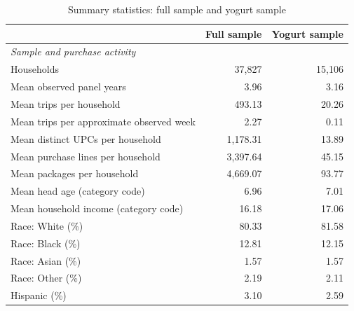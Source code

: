 \begin{table}[htbp]
\centering
\caption{Summary statistics: full sample and yogurt sample}
\label{tab:full-panel-vs-yogurt}
\begin{tabular}{lrr}
\toprule
 & Full sample & Yogurt sample \\
\midrule
\multicolumn{3}{l}{\textit{Sample and purchase activity}} \\
Households & 37,827 & 15,106 \\
Mean observed panel years & 3.96 & 3.16 \\
Mean trips per household & 493.13 & 20.26 \\
Mean trips per approximate observed week & 2.27 & 0.11 \\
Mean distinct UPCs per household & 1,178.31 & 13.89 \\
Mean purchase lines per household & 3,397.64 & 45.15 \\
Mean packages per household & 4,669.07 & 93.77 \\
Mean head age (category code) & 6.96 & 7.01 \\
Mean household income (category code) & 16.18 & 17.06 \\
Race: White (\%) & 80.33 & 81.58 \\
Race: Black (\%) & 12.81 & 12.15 \\
Race: Asian (\%) & 1.57 & 1.57 \\
Race: Other (\%) & 2.19 & 2.11 \\
Hispanic (\%) & 3.10 & 2.59 \\
\bottomrule
\end{tabular}
\end{table}
